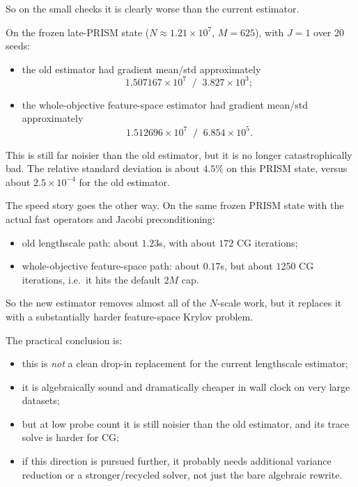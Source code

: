 \documentclass[11pt]{article}
\begin{document}
So on the small checks it is clearly worse than the current estimator.

On the frozen late-PRISM state ($N \approx 1.21\times 10^7$, $M=625$), with
$J=1$ over 20 seeds:
\begin{itemize}
  \item the old estimator had gradient mean/std approximately
  \[
    1.507167\times 10^7 \;\; / \;\; 3.827\times 10^3;
  \]
  \item the whole-objective feature-space estimator had gradient mean/std
  approximately
  \[
    1.512696\times 10^7 \;\; / \;\; 6.854\times 10^5.
  \]
\end{itemize}

This is still far noisier than the old estimator, but it is no longer
catastrophically bad. The relative standard deviation is about $4.5\%$ on this
PRISM state, versus about $2.5\times 10^{-4}$ for the old estimator.

The speed story goes the other way. On the same frozen PRISM state with the
actual fast operators and Jacobi preconditioning:
\begin{itemize}
  \item old lengthscale path: about $1.23$s, with about $172$ CG iterations;
  \item whole-objective feature-space path: about $0.17$s, but about $1250$ CG
  iterations, i.e.\ it hits the default $2M$ cap.
\end{itemize}

So the new estimator removes almost all of the $N$-scale work, but it replaces
it with a substantially harder feature-space Krylov problem.

The practical conclusion is:
\begin{itemize}
  \item this is \emph{not} a clean drop-in replacement for the current
  lengthscale estimator;
  \item it is algebraically sound and dramatically cheaper in wall clock on
  very large datasets;
  \item but at low probe count it is still noisier than the old estimator, and
  its trace solve is harder for CG;
  \item if this direction is pursued further, it probably needs additional
  variance reduction or a stronger/recycled solver, not just the bare algebraic
  rewrite.
 \end{itemize}
\end{document}
